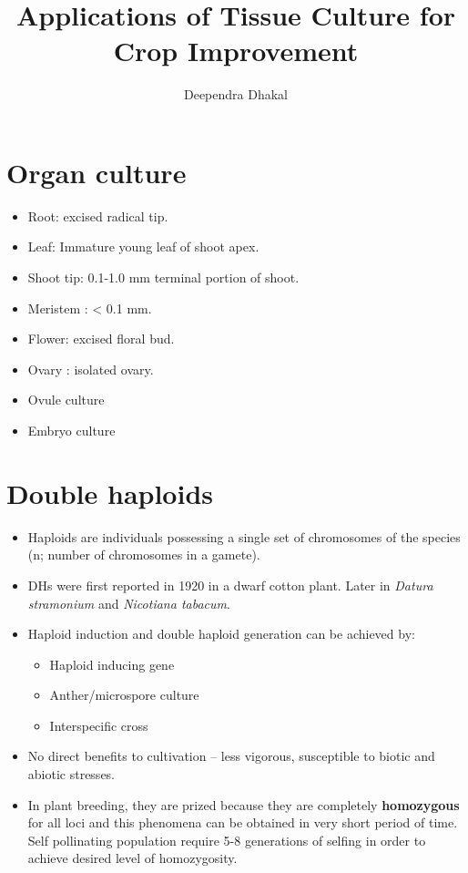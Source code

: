 \documentclass[
  ignorenonframetext,
  aspectratio=169]{beamer}
\title{Applications of Tissue Culture for Crop Improvement}
\author{Deependra Dhakal}
\date{}
\institute{College of Natural Resource Management, Tikapur,
Kailali \and Agriculture and Forestry University}
\providecommand{\tightlist}{%
  \setlength{\itemsep}{0pt}\setlength{\parskip}{0pt}}
\begin{document}
\frame{\titlepage}

\begin{frame}[allowframebreaks]
  \tableofcontents[hideallsubsections]
\end{frame}
\hypertarget{organ-culture}{%
\section{Organ culture}\label{organ-culture}}

\begin{frame}{}
\protect\hypertarget{section}{}
\begin{itemize}
\tightlist
\item
  Root: excised radical tip.
\item
  Leaf: Immature young leaf of shoot apex.
\item
  Shoot tip: 0.1-1.0 mm terminal portion of shoot.
\item
  Meristem : \textless{} 0.1 mm.
\item
  Flower: excised floral bud.
\item
  Ovary : isolated ovary.
\item
  Ovule culture
\item
  Embryo culture
\end{itemize}
\end{frame}

\hypertarget{double-haploids}{%
\section{Double haploids}\label{double-haploids}}

\begin{frame}{}
\protect\hypertarget{section-1}{}
\begin{itemize}
\tightlist
\item
  Haploids are individuals possessing a single set of chromosomes of the
  species (n; number of chromosomes in a gamete).
\item
  DHs were first reported in 1920 in a dwarf cotton plant. Later in
  \emph{Datura stramonium} and \emph{Nicotiana tabacum}.
\item
  Haploid induction and double haploid generation can be achieved by:

  \begin{itemize}
  \tightlist
  \item
    Haploid inducing gene
  \item
    Anther/microspore culture
  \item
    Interspecific cross
  \end{itemize}
\item
  No direct benefits to cultivation -- less vigorous, susceptible to
  biotic and abiotic stresses.
\item
  In plant breeding, they are prized because they are completely
  \textbf{homozygous} for all loci and this phenomena can be obtained in
  very short period of time. Self pollinating population require 5-8
  generations of selfing in order to achieve desired level of
  homozygosity.
\end{itemize}
\end{frame}
\end{document}

